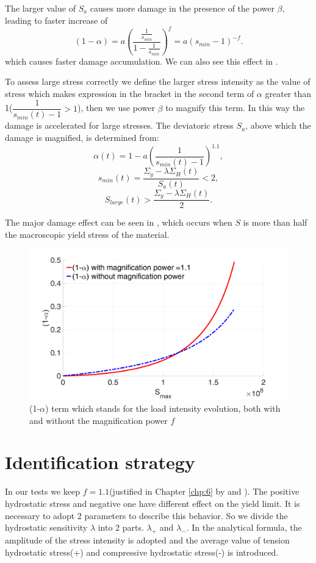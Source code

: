 The larger value of $S_{a}$ causes more damage in the presence of the power $\beta$, leading to faster increase of 
$$(1-\alpha)=a\left(  \dfrac{\frac{1}{s_{min}}}{1-\frac{1}{s_{min}}} \right) ^{f}=a(s_{min}-1)^{-f}.$$ 
which causes faster damage accumulation. We can also see this effect in . 

To assess large stress correctly we define the larger stress intensity as the value of stress which makes expression in the bracket in the second term of $\alpha$ greater than 1($ \dfrac{1}{ s_{min}(t)-1 }>1$), then we use power $\beta$ to magnify this term. In this way the damage is accelerated for large stresses. The deviatoric stress $S_{a}$, above which the damage is magnified,  is determined from: 
$$\alpha(t)=1-a\left( \dfrac{1}{ s_{min}(t)-1 } \right)^{1.1},$$
$$s_{min}(t)=\dfrac{\Sigma_y-\lambda \Sigma_H(t)}{S_{a}(t)}<2,$$
$$S_{large}(t)>\dfrac{\Sigma_y-\lambda \Sigma_H(t)}{2}.$$ 

The major damage effect can be seen in , which occurs when $S$ is more than half the macroscopic yield stress of the material.

\begin{figure}[!h]
\centering
\includegraphics[width=\textwidth]{figures//alp_Smax_fb.png} 
\caption{(1-$\alpha$) term which stands for the load intensity evolution, both with and without the magnification power $f$}
\label{fig.SmaxSequence}
\end{figure}

\clearpage
\section{Identification strategy}
\label{sec:5.9}
In our tests we keep $f=1.1$(justified in Chapter \ref{chp:6} by  and ). The positive hydrostatic stress and negative one have different effect on the yield limit. It is necessary to adopt 2 parameters to describe this behavior. So we divide the hydrostatic sensitivity $\lambda$ into 2 parts. $\lambda_+$ and $\lambda_-$. In the analytical formula, the amplitude of the stress intensity is adopted and the average value of tension hydrostatic stress(+) and compressive hydrostatic stress(-) is introduced.

